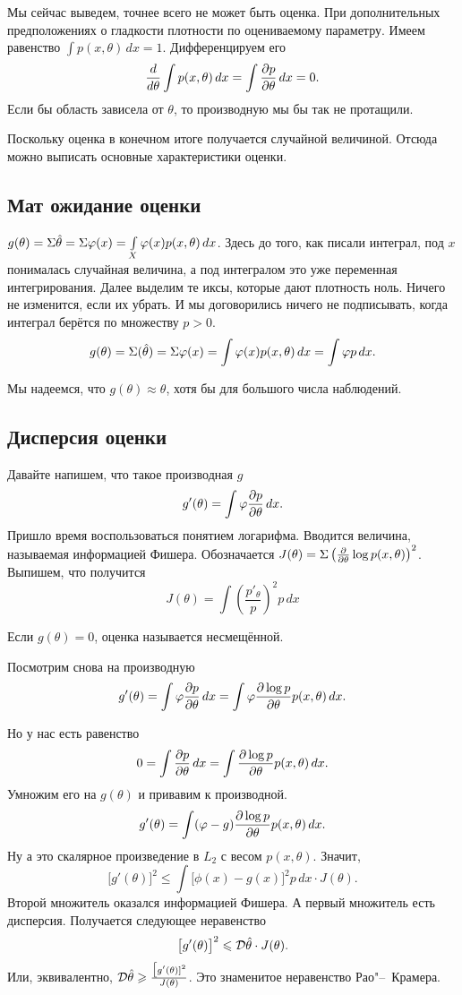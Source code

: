 Мы сейчас выведем, точнее всего не может быть оценка. При дополнительных предположениях о гладкости плотности по оцениваемому параметру. Имеем равенство $\int p(x,\theta)\,dx =1$. Дифференцируем его
\[
  \frac{d }{d\theta} \int p(x,\theta)\,dx = \int \frac{\partial p}{\partial \theta}\,dx = 0.
\]
Если бы область зависела от $\theta$, то производную мы бы так не протащили.

Поскольку оценка в конечном итоге получается случайной величиной. Отсюда можно выписать основные характеристики оценки.
\subsection{Мат ожидание оценки}
 $g(\theta) = \Sigma \hat\theta = \Sigma \varphi(x) = \int\limits_X \varphi(x) p(x,\theta)\,dx$. Здесь до того, как писали интеграл, под $x$ понималась случайная величина, а под интегралом это уже переменная интегрирования. Далее выделим те иксы, которые дают плотность ноль. Ничего не изменится, если их убрать. И мы договорились ничего не подписывать, когда интеграл берётся по множеству $p>0$.
\[
  g(\theta) = \Sigma(\hat\theta) = \Sigma\varphi(x) = \int\varphi(x) p(x,\theta)\,dx = \int \varphi p\,dx.
\]

Мы надеемся, что $g(\theta) \approx \theta$, хотя бы для большого числа наблюдений.

\subsection{Дисперсия оценки}
Давайте напишем, что такое производная $g$
\[
  g'(\theta) = \int \varphi\frac{\partial p}{\partial \theta}\,dx.
\]
Пришло время воспользоваться понятием логарифма. Вводится величина, называемая информацией Фишера. Обозначается $J(\theta) = \Sigma \left(\frac{\partial  }{\partial \theta}\log p(x,\theta)\right)^2$. Выпишем, что получится
\[
  J(\theta) = \int \left( \frac{p'_\theta}{p} \right)^2p\,dx
\]

Если $g(\theta)=0$, оценка называется несмещённой.

Посмотрим снова на производную
\[
  g'(\theta) = \int \varphi \frac{\partial p}{\partial \theta} \,dx = \int\varphi \frac{\partial \log p}{\partial \theta} p(x,\theta)\,dx.
\]

Но у нас есть равенство
\[
  0 = \int \frac{\partial p}{\partial \theta} \,dx = \int \frac{\partial \log p}{\partial \theta} p(x,\theta)\,dx.
\]
Умножим его на $g(\theta)$ и привавим к производной.
\[
  g'(\theta) =\int (\varphi - g)\frac{\partial \log p}{\partial \theta}p(x,\theta)\,dx. 
\]
Ну а это скалярное произведение в $L_2$ с весом $p(x,\theta)$. Значит,
\[
  \big[g'(\theta)\big]^2\le \int \big[\phi(x)-g(x)\big]^2p\,dx \cdot J(\theta).
\]
Второй множитель оказался информацией Фишера. А первый множитель есть дисперсия. Получается следующее неравенство
\[
\big[  g'(\theta)\big]^2\leqslant \mathcal D \hat\theta \cdot J(\theta).
\]
Или, эквивалентно, $\mathcal D\hat\theta\geqslant \frac{\big[g'(\theta)]^2}{J(\theta)}$. Это знаменитое неравенство Рао"--~Крамера.

